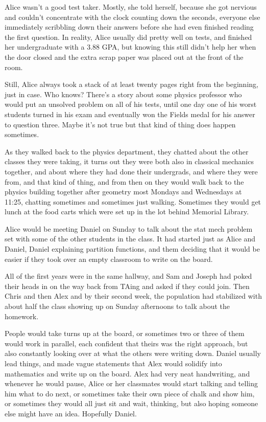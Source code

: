 Alice wasn't a good test taker. Mostly, she told herself, because she got nervious and couldn't concentrate with the clock counting down the seconds, everyone else immediately scribbling down their answers before she had even finished reading the first question. In reality, Alice usually did pretty well on tests, and finished her undergraduate with a 3.88 GPA, but knowing this still didn't help her when the door closed and the extra scrap paper was placed out at the front of the room.

Still, Alice always took a stack of at least twenty pages right from the beginning, just in case. Who knows? There's a story about some physics professor who would put an unsolved problem on all of his tests, until one day one of his worst students turned in his exam and eventually won the Fields medal for his answer to question three. Maybe it's not true but that kind of thing does happen sometimes. 

As they walked back to the physics department, they chatted about the other classes they were taking, it turns out they were both also in classical mechanics together, and about where they had done their undergrads, and where they were from, and that kind of thing, and from then on they would walk back to the physics building together after geometry most Mondays and Wednesdays at 11:25, chatting sometimes and sometimes just walking. Sometimes they would get lunch at the food carts which were set up in the lot behind Memorial Library. 

\mypause

Alice would be meeting Daniel on Sunday to talk about the stat mech problem set with some of the other students in the class. It had started just as Alice and Daniel, Daniel explaining partition functions, and them deciding that it would be easier if they took over an empty classroom to write on the board.

All of the first years were in the same hallway, and Sam and Joseph had poked their heads in on the way back from TAing and asked if they could join. Then Chris and then Alex and by their second week, the population had stabilized with about half the class showing up on Sunday afternoons to talk about the homework.

People would take turns up at the board, or sometimes two or three of them would work in parallel, each confident that theirs was the right approach, but also constantly looking over at what the others were writing down. Daniel usually lead things, and made vague statements that Alex would solidify into mathematics and write up on the board. Alex had very neat handwriting, and whenever he would pause, Alice or her classmates would start talking and telling him what to do next, or sometimes take their own piece of chalk and show him, or sometimes they would all just sit and wait, thinking, but also hoping someone else might have an idea. Hopefully Daniel.

